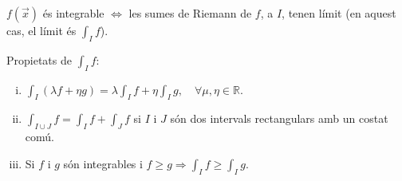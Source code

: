 \begin{thm}
	$f(\vec{x})$ és integrable $\Leftrightarrow$ les sumes de Riemann de $f$, a $I$, tenen límit (en aquest cas, el límit és $\displaystyle \int_{I} f$).
\end{thm}
Propietats de $\displaystyle \int_{I} f$:
\begin{enumerate}[i)]
	\item $\displaystyle \int_{I} (\lambda f + \eta g) = \lambda \int_{I} f + \eta \int_{I} g, \quad \forall \mu, \eta \in \mathbb{R}$.
	\item $\displaystyle \int_{I \cup J} f = \int_{I} f + \int_{J} f$ si $I$ i $J$ són dos intervals rectangulars amb un costat comú.
	\item Si $f$ i $g$ són integrables i $\displaystyle f \geq g \Rightarrow \int_{I} f \geq \int_{I} g$.
\end{enumerate}

